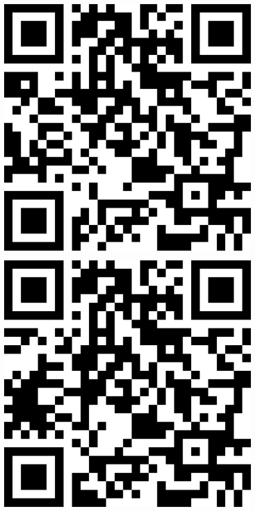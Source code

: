 \documentclass[letterpaper]{article}
\begin{document}
 \endgroup 
 \vspace*{\fill} 
 \pagebreak 
{} 
 \vspace*{\fill} 
 \begingroup 
 \centerline{\includegraphics[scale=1,width=5in,height=5in]{Office3515.png}} 
 \endgroup 
 \vspace*{\fill} 
 \pagebreak 
{} 
 \vspace*{\fill} 
 \begingroup 
 \centerline{\includegraphics[scale=1,width=5in,height=5in]{Office3517.png}} 
\end{document}
